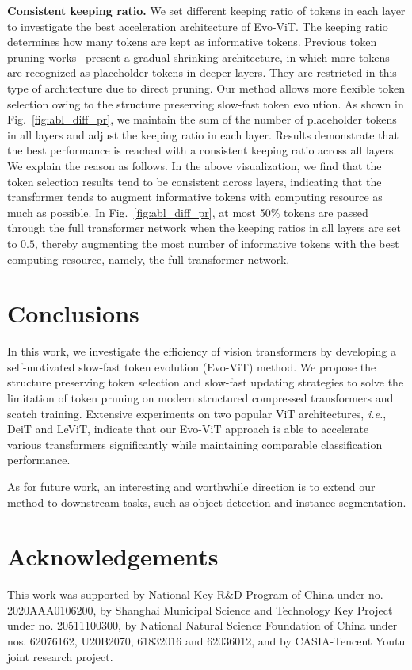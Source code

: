 \documentclass[letterpaper]{article} \usepackage{aaai22}  \usepackage{times}  \usepackage{helvet}  \usepackage{courier}  \usepackage[hyphens]{url}  \usepackage{graphicx} \urlstyle{rm} \def\UrlFont{\rm}  \usepackage{natbib}  \usepackage{caption} \DeclareCaptionStyle{ruled}{labelfont=normalfont,labelsep=colon,strut=off} \frenchspacing  \setlength{\pdfpagewidth}{8.5in}  \setlength{\pdfpageheight}{11in}  \usepackage{algorithm}
\begin{document}
\noindent\textbf{Consistent keeping ratio.} 
We set different keeping ratio of tokens in each layer to investigate the best acceleration architecture of Evo-ViT. The keeping ratio determines how many tokens are kept as informative tokens. Previous token pruning works~\cite{DynamicViT,PatchSlimming} present a gradual shrinking architecture, in which more tokens are recognized as placeholder tokens in deeper layers. They are restricted in this type of architecture due to direct pruning. Our method allows more flexible token selection owing to the structure preserving slow-fast token evolution. As shown in Fig.~\ref{fig:abl_diff_pr}, we maintain the sum of the number of placeholder tokens in all layers and adjust the keeping ratio in each layer. Results demonstrate that the best performance is reached with a consistent keeping ratio across all layers.
We explain the reason as follows. 
In the above visualization, we find that the token selection results tend to be consistent across layers, indicating that the transformer tends to augment informative tokens with computing resource as much as possible. 
In Fig.~\ref{fig:abl_diff_pr}, at most 50$\%$ tokens are passed through the full transformer network when the keeping ratios in all layers are set to $0.5$, thereby augmenting the most number of informative tokens with the best computing resource, namely, the full transformer network. 
\section{Conclusions}
\label{sec:conclusions}
In this work, we investigate the efficiency of vision transformers by developing a self-motivated slow-fast token evolution (Evo-ViT) method. We propose the structure preserving token selection and slow-fast updating strategies to solve the limitation of token pruning on modern structured compressed transformers and scatch training. Extensive experiments on two popular ViT architectures, \emph{i.e.}, DeiT and LeViT, indicate that our Evo-ViT approach is able to accelerate various transformers significantly while maintaining comparable classification performance.

As for future work, an interesting and worthwhile direction is to extend our method to downstream tasks, such as object detection and instance segmentation. 
 
\section{Acknowledgements}
This work was supported by National Key R\&D Program of China under no. 2020AAA0106200, by Shanghai Municipal Science and Technology Key Project under no. 20511100300, by National Natural Science Foundation of China under nos. 62076162, U20B2070, 61832016 and 62036012, and by CASIA-Tencent Youtu joint research project.


\end{document}
